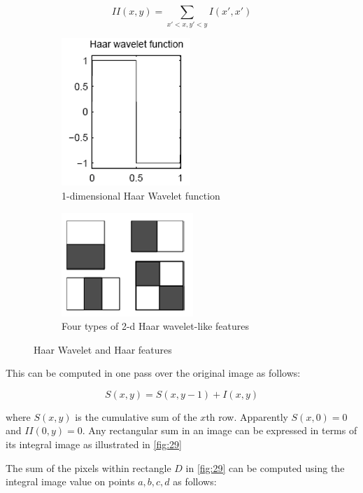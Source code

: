 \begin{equation}
    II(x, y) = \sum_{x' < x, y' < y}{I(x' , x')}
\end{equation}

\newpage
\begin{figure}[h!]
    \centering
    \begin{subfigure}{0.25\textwidth}
      \centering
      \includegraphics{img/25_1.png}
      \caption{1-dimensional Haar Wavelet function}
      \label{fig:25_sub1}
    \end{subfigure}%
    \begin{subfigure}{0.25\textwidth}
      \centering
      \includegraphics{img/25_2.png}
      \caption{Four types of 2-d Haar wavelet-like features}
      \label{fig:25_sub2}
    \end{subfigure}
    \caption{Haar Wavelet and Haar features}
    \label{fig:25}
\end{figure}

\par
This can be computed in one pass over the original image as follows:

\begin{equation}
    S(x, y) = S(x, y - 1) + I(x, y)
\end{equation}

where $S(x, y)$ is the cumulative sum of the $x$th row. Apparently $S(x, 0) = 0$ and $II(0, y) = 0$. Any rectangular sum in an image can be expressed in terms of its integral image as illustrated in \ref{fig:29}

\par
The sum of the pixels within rectangle $D$ in \ref{fig:29} can be computed using the integral image value on points $a, b, c, d$ as follows:

